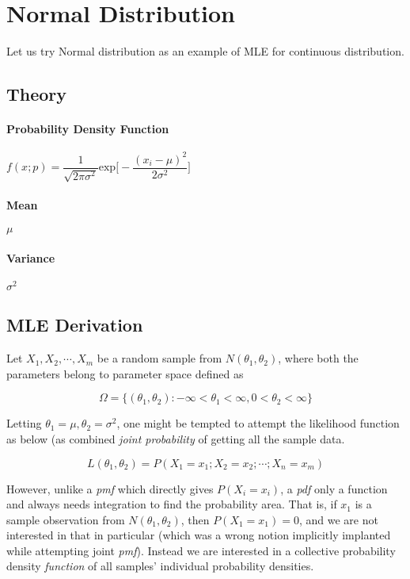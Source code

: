 \documentclass[float=false,crop=false]{standalone}
\begin{document}
    \section{Normal Distribution}\label{normal-distribution}

Let us try Normal distribution as an example of MLE for continuous
distribution.

\subsection{Theory}\label{theory}

\paragraph{Probability Density
Function}\label{probability-density-function}

\(f(x;p) = \dfrac{1}{\sqrt{2\pi\sigma^2}}\text{exp}\Big[ -\dfrac{(x_i - \mu)^2}{2\sigma^2} \Big]\)

\paragraph{Mean}\label{mean}

\(\mu\)

\paragraph{Variance}\label{variance}

\(\sigma^2\)

    \subsection{MLE Derivation}\label{mle-derivation}

Let \(X_1, X_2, \cdots, X_m\) be a random sample from
\(N(\theta_1, \theta_2)\), where both the parameters belong to parameter
space defined as

\[
\Omega = \{ (\theta_1, \theta_2): -\infty < \theta_1 < \infty, 0 < \theta_2 < \infty \}
\]

Letting \(\theta_1 = \mu, \theta_2 = \sigma^2\), one might be tempted to
attempt the likelihood function as below (as combined \emph{joint
probability} of getting all the sample data.

\[
L(\theta_1,\theta_2) = P(X_1=x_1;X_2=x_2;\cdots;X_n=x_m)
\]

    However, unlike a \emph{pmf} which directly gives \(P(X_i=x_i)\), a
\emph{pdf} only a function and always needs integration to find the
probability area. That is, if \(x_1\) is a sample observation from
\(N(\theta_1, \theta_2)\), then \(P(X_1=x_1)=0\), and we are not
interested in that in particular (which was a wrong notion implicitly
implanted while attempting joint \emph{pmf}). Instead we are interested
in a collective probability density \emph{function} of all samples'
individual probability densities.
\end{document}
